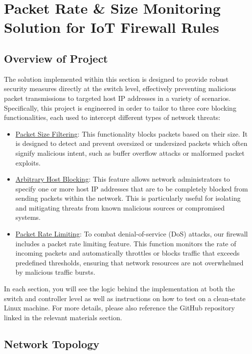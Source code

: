 \section{Packet Rate & Size Monitoring Solution for IoT Firewall Rules}
\subsection{Overview of Project}
The solution implemented within this section is designed to provide robust security measures directly at the switch level, effectively preventing malicious packet transmissions to targeted host IP addresses in a variety of scenarios. Specifically, this project is engineered in order to tailor to three core blocking functionalities, each used to intercept different types of network threats:
\begin{itemize}
    \item \underline{Packet Size Filtering}: This functionality blocks packets based on their size. It is designed to detect and prevent oversized or undersized packets which often signify malicious intent, such as buffer overflow attacks or malformed packet exploits.
    \item \underline{Arbitrary Host Blocking}: This feature allows network administrators to specify one or more host IP addresses that are to be completely blocked from sending packets within the network. This is particularly useful for isolating and mitigating threats from known malicious sources or compromised systems.
    \item \underline{Packet Rate Limiting}: To combat denial-of-service (DoS) attacks, our firewall includes a packet rate limiting feature. This function monitors the rate of incoming packets and automatically throttles or blocks traffic that exceeds predefined thresholds, ensuring that network resources are not overwhelmed by malicious traffic bursts.
\end{itemize}
In each section, you will see the logic behind the implementation at both the switch and controller level as well as instructions on how to test on a clean-state Linux machine. For more details, please also reference the GitHub repository linked in the relevant materials section. 
\subsection{Network Topology}
